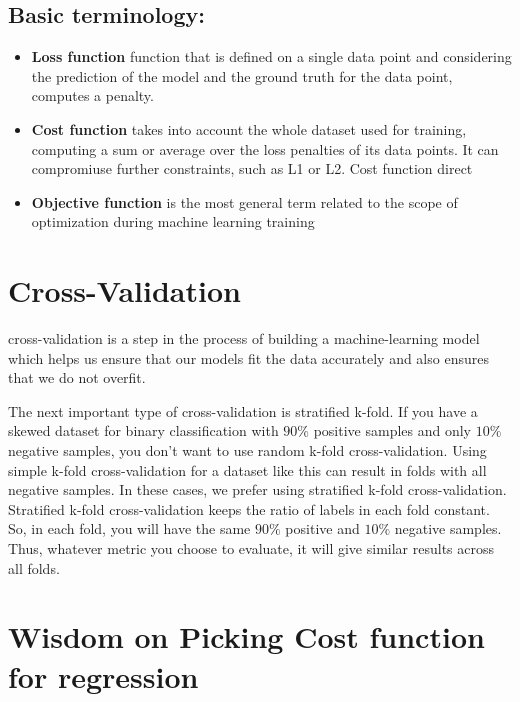 \documentclass[openany]{book}
\begin{document}
\subsection{Basic terminology:}

\begin{itemize}
    \item \textbf{Loss function} function that is defined on a single data point and considering the prediction of the model and the ground truth for the data point, computes a penalty. 

    \item \textbf{Cost function} takes into account the whole dataset used for training, computing a sum or average over the loss penalties of its data points. It can compromiuse further constraints, such as L1 or L2. Cost function direct

    \item \textbf{Objective function} is the most general term related to the scope of optimization during machine learning training


    
\end{itemize}



\section{Cross-Validation}

cross-validation is a step in the process of building a machine-learning model which helps us ensure that our models fit the data accurately and also ensures that we do not overfit.




The next important type of cross-validation is stratified k-fold. If you have a skewed dataset for binary classification with $90 \%$ positive samples and only $10 \%$ negative samples, you don't want to use random k-fold cross-validation. Using simple k-fold cross-validation for a dataset like this can result in folds with all negative samples. In these cases, we prefer using stratified k-fold cross-validation. Stratified k-fold cross-validation keeps the ratio of labels in each fold constant. So, in each fold, you will have the same $90 \%$ positive and $10 \%$ negative samples. Thus, whatever metric you choose to evaluate, it will give similar results across all folds.




\section{Wisdom on Picking Cost function for regression}
\end{document}
